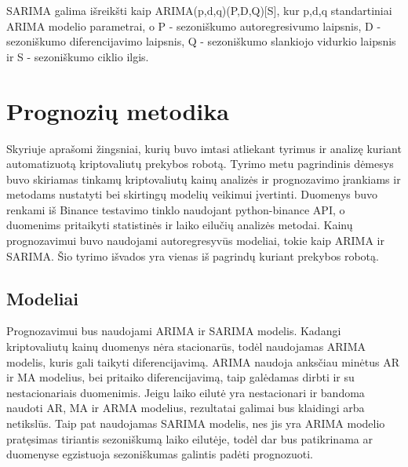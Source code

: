 \documentclass{VUMIFInfKursinis}
\begin{document}
SARIMA galima išreikšti kaip ARIMA(p,d,q)(P,D,Q)[S], kur p,d,q standartiniai ARIMA modelio parametrai, o P - sezoniškumo autoregresivumo laipsnis,
D - sezoniškumo diferencijavimo laipsnis, Q - sezoniškumo slankiojo vidurkio laipsnis ir S - sezoniškumo ciklio ilgis. 

\section{Prognozių metodika}

Skyriuje aprašomi žingsniai, kurių buvo imtasi atliekant tyrimus ir analizę kuriant automatizuotą kriptovaliutų prekybos robotą. 
Tyrimo metu pagrindinis dėmesys buvo skiriamas tinkamų kriptovaliutų kainų analizės ir prognozavimo įrankiams ir metodams nustatyti bei skirtingų modelių veikimui įvertinti. 
Duomenys buvo renkami iš Binance testavimo tinklo naudojant python-binance API, o duomenims pritaikyti statistinės ir laiko eilučių analizės metodai. 
Kainų prognozavimui buvo naudojami autoregresyvūs modeliai, tokie kaip ARIMA ir SARIMA. 
Šio tyrimo išvados yra vienas iš pagrindų kuriant prekybos robotą.

\subsection{Modeliai}
Prognozavimui bus naudojami ARIMA ir SARIMA modelis. Kadangi kriptovaliutų kainų duomenys nėra stacionarūs, todėl naudojamas ARIMA modelis, kuris gali taikyti diferencijavimą.
ARIMA naudoja anksčiau minėtus AR ir MA modelius, bei pritaiko diferencijavimą, taip galėdamas dirbti ir su nestacionariais duomenimis. 
Jeigu laiko eilutė yra nestacionari ir bandoma naudoti AR, MA ir ARMA modelius, rezultatai galimai bus klaidingi arba netikslūs.
Taip pat naudojamas SARIMA modelis, nes jis yra ARIMA modelio pratęsimas tiriantis sezoniškumą laiko eilutėje, todėl dar bus patikrinama ar duomenyse egzistuoja sezoniškumas
galintis padėti prognozuoti.

\end{document}
